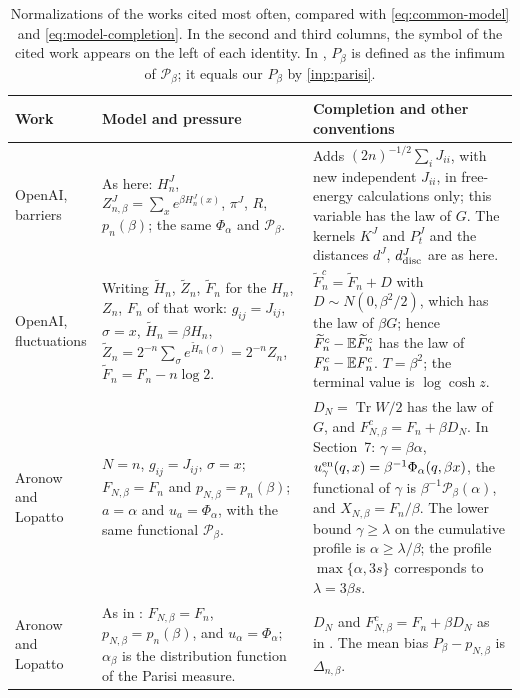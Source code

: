 \begin{table}[ht]
\centering
\small
\renewcommand{\arraystretch}{1.15}
\begin{tabular}{>{\raggedright\arraybackslash}p{}>{\raggedright\arraybackslash}p{}>{\raggedright\arraybackslash}p{}}
\toprule
Work & Model and pressure & Completion and other conventions\\
\midrule
OpenAI, barriers \cite[Section~1, (1.1), pp.~2--3; Section~2, (2.1), (2.12)--(2.14)]{oai-barriers}
& As here: $H_n^J$, $Z^J_{n,\beta}=\sum_xe^{\beta H_n^J(x)}$, $\pi^J$, $R$, $p_n(\beta)$; the same $\Phi_\alpha$ and $\mathcal P_\beta$.
& Adds $(2n)^{-1/2}\sum_iJ_{ii}$, with new independent $J_{ii}$, in free-energy calculations only; this variable has the law of $G$. The kernels $K^J$ and $P^J_t$ and the distances $d^J$, $d^J_{\rm disc}$ are as here.\\
\addlinespace
OpenAI, fluctuations \cite[Section~1, p.~1; Section~5.2, p.~48; Section~7, p.~66]{oai-fluctuations}
& Writing $\widetilde H_n$, $\widetilde Z_n$, $\widetilde F_n$ for the $H_n$, $Z_n$, $F_n$ of that work: $g_{ij}=J_{ij}$, $\sigma=x$, $\widetilde H_n=\beta H_n$, $\widetilde Z_n=2^{-n}\sum_\sigma e^{\widetilde H_n(\sigma)}=2^{-n}Z_n$, $\widetilde F_n=F_n-n\log2$.
& $\widetilde F_n^c=\widetilde F_n+D$ with $D\sim N(0,\beta^2/2)$, which has the law of $\beta G$; hence $\widetilde F_n^c-\mathbb E\widetilde F_n^c$ has the law of $F_n^c-\mathbb E F_n^c$. $T=\beta^2$; the terminal value is $\log\cosh z$.\\
\addlinespace
Aronow and Lopatto \cite[(1.1)--(1.3), p.~4; Section~7.1, pp.~53--54; (7.64), p.~93]{quantitative-parisi}
& $N=n$, $g_{ij}=J_{ij}$, $\sigma=x$; $F_{N,\beta}=F_n$ and $p_{N,\beta}=p_n(\beta)$; $a=\alpha$ and $u_a=\Phi_\alpha$, with the same functional $\mathcal P_\beta$.
& $D_N=\operatorname{Tr}W/2$ has the law of $G$, and $F^c_{N,\beta}=F_n+\beta D_N$. In Section~7: $\gamma=\beta\alpha$, $u^{\rm en}_\gamma(q,x)=\beta^{-1}\Phi_\alpha(q,\beta x)$, the functional of $\gamma$ is $\beta^{-1}\mathcal P_\beta(\alpha)$, and $X_{N,\beta}=F_n/\beta$. The lower bound $\gamma\ge\lambda$ on the cumulative profile is $\alpha\ge\lambda/\beta$; the profile $\max\{\alpha,3s\}$ corresponds to $\lambda=3\beta s$.\\
\addlinespace
Aronow and Lopatto \cite[Section~1.1, p.~1; Section~3.1, p.~33]{hexagon-bias}
& As in \cite{quantitative-parisi}: $F_{N,\beta}=F_n$, $p_{N,\beta}=p_n(\beta)$, and $u_\alpha=\Phi_\alpha$; $\alpha_\beta$ is the distribution function of the Parisi measure.
& $D_N$ and $F^c_{N,\beta}=F_n+\beta D_N$ as in \cite{quantitative-parisi}. The mean bias $P_\beta-p_{N,\beta}$ is $\Delta_{n,\beta}$.\\
\bottomrule
\end{tabular}
\caption{Normalizations of the works cited most often, compared with \eqref{eq:common-model} and \eqref{eq:model-completion}. In the second and third columns, the symbol of the cited work appears on the left of each identity. In \cite{oai-barriers,quantitative-parisi,hexagon-bias}, $P_\beta$ is defined as the infimum of $\mathcal P_\beta$; it equals our $P_\beta$ by \cref{inp:parisi}.}
\label{tab:model-dictionary}
\end{table}

